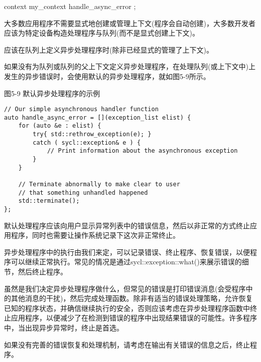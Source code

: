 context my\_context{ handle\_async\_error };\par

大多数应用程序不需要显式地创建或管理上下文(程序会自动创建)，大多数开发者应该为特定设备构造处理程序与队列(而不是显式创建上下文)。\par

\begin{tcolorbox}[colback=red!5!white,colframe=red!75!black]
应该在队列上定义异步处理程序时(除非已经显式的管理了上下文)。
\end{tcolorbox}

如果没有为队列或队列的父上下文定义异步处理程序，在处理队列(或上下文中)上发生的异步错误时，会使用默认的异步处理程序，就如图5-9所示。\par

\hspace*{\fill} \par %
图5-9 默认异步处理程序的示例
\begin{lstlisting}[caption={}]
// Our simple asynchronous handler function
auto handle_async_error = [](exception_list elist) {
	for (auto &e : elist) {
		try{ std::rethrow_exception(e); }
		catch ( sycl::exception& e ) {
			// Print information about the asynchronous exception
		}
	}

	// Terminate abnormally to make clear to user
	// that something unhandled happened
	std::terminate();
};
\end{lstlisting}

默认处理程序应该向用户显示异常列表中的错误信息，然后以非正常的方式终止应用程序，同时也需要让操作系统记录下这次非正常终止。\par

异步处理程序中的执行由我们来定，可以记录错误、终止程序、恢复错误，以便程序可以继续正常执行。常见的情况是通过sycl::exception::what()来展示错误的细节，然后终止程序。\par

虽然是我们决定异步处理程序做什么，但常见的错误是打印错误消息(会受程序中的其他消息的干扰)，然后完成处理函数。除非有适当的错误处理策略，允许恢复已知的程序状态，并确信继续执行的安全，否则应该考虑在异步处理程序函数中终止应用程序，以便减少了在检测到错误的程序中出现结果错误的可能性。许多程序中，当出现异步异常时，终止是首选。\par

\begin{tcolorbox}[colback=red!5!white,colframe=red!75!black]
如果没有完善的错误恢复和处理机制，请考虑在输出有关错误的信息之后，终止程序。
\end{tcolorbox}

